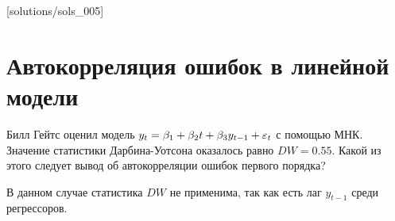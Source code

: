 
[solutions/sols_005]

\chapter{Автокорреляция ошибок в линейной модели}

\begin{problem}
Билл Гейтс оценил модель $y_t=\beta_1 + \beta_2 t + \beta_3 y_{t-1} + \varepsilon_t$ с помощью МНК. Значение статистики Дарбина-Уотсона оказалось равно $DW=0.55$. Какой из этого следует вывод об автокорреляции ошибок первого порядка?


\begin{sol}
В данном случае статистика $DW$ не применима, так как есть лаг $y_{t-1}$ среди регрессоров.
\end{sol}
\end{problem}


